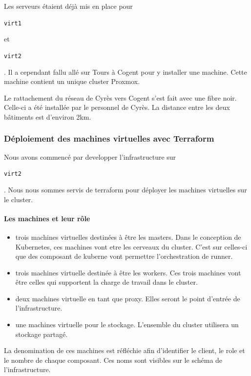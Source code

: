 \documentclass[12pt]{article}
\begin{document}
Les serveurs étaient déjà mis en place pour \begin{code}\texttt{virt1}\end{code} et \begin{code}\texttt{virt2}\end{code}. 
Il a cependant fallu allé sur Tours à Cogent pour y installer une machine. 
Cette machine contient un unique \gls{cluster} \gls{Proxmox}. 

Le rattachement du réseau de Cyrès vers Cogent s'est fait avec une fibre noir.
Celle-ci a été installée par le personnel de Cyrès.
La distance entre les deux bâtiments est d'environ 2km.

\subsubsection{Déploiement des machines virtuelles avec Terraform}
Nous avons commencé par developper l'infrastructure sur \begin{code}\texttt{virt2}\end{code}. 
Nous nous sommes servis de terraform pour déployer les machines virtuelles sur le \gls{cluster}. 

\paragraph{Les machines et leur rôle}
\begin{itemize}
    \item trois machines virtuelles destinées à être les masters. 
    Dans le conception de \gls{Kubernetes}, ces machines vont etre les cerveaux du \gls{cluster}.
    C'est sur celles-ci que des composant de kuberne vont permettre l'orchestration de runner.
    \item trois machines virtuelle destinée à être les workers. 
    Ces trois machines vont être celles qui supportent la charge de travail dans le \gls{cluster}.
    \item deux machines virtuelle en tant que proxy. 
    Elles seront le point d'entrée de l'infrastructure. 
    \item une machines virtuelle pour le stockage. 
    L'ensemble du \gls{cluster} utilisera un stockage partagé.
\end{itemize}

La denomination de ces machines est réfléchie afin d'identifier le client, le role et le nombre de chaque composant. 
Ces noms sont visibles sur le schéma de l'infrastructure.
\end{document}
